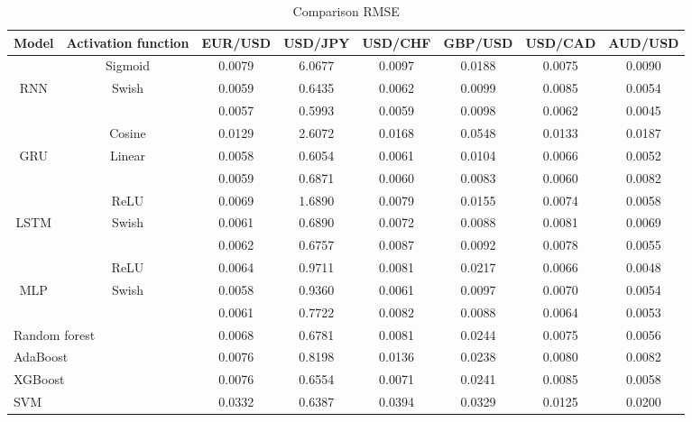 \documentclass{ieeeaccess}
\begin{document}
\begin{table}[t]
  \caption{Comparison RMSE}
  \small
  \centering
  \begin{tabular*}{0.9\textwidth}{c @{\extracolsep{\fill}} ccccccc}
    \hline
    \textbf{Model} & \textbf{Activation function} & \textbf{EUR/USD} & \textbf{USD/JPY} & \textbf{USD/CHF} & \textbf{GBP/USD} & \textbf{USD/CAD} & \textbf{AUD/USD} \\
    \hline

           & Sigmoid & 0.0079 & 6.0677 & 0.0097 & 0.0188 & 0.0075 & 0.0090 \\
    RNN    & Swish & 0.0059 & 0.6435 & 0.0062 & 0.0099 & 0.0085 & 0.0054 \\
           & \cite{Munkhdalai2019} & 0.0057 & 0.5993 & 0.0059 & 0.0098 & 0.0062 & 0.0045 \\

    \hline

           & Cosine & 0.0129 & 2.6072 & 0.0168 & 0.0548 & 0.0133 & 0.0187 \\
    GRU    & Linear & 0.0058 & 0.6054 & 0.0061 & 0.0104 & 0.0066 & 0.0052 \\
           & \cite{Munkhdalai2019} & 0.0059 & 0.6871 & 0.0060 & 0.0083 & 0.0060 & 0.0082 \\

    \hline

           & ReLU & 0.0069 & 1.6890 & 0.0079 & 0.0155 & 0.0074 & 0.0058 \\
    LSTM   & Swish & 0.0061 & 0.6890 & 0.0072 & 0.0088 & 0.0081 & 0.0069 \\
           & \cite{Munkhdalai2019} & 0.0062 & 0.6757 & 0.0087 & 0.0092 & 0.0078 & 0.0055 \\
    
    \hline

           & ReLU & 0.0064 & 0.9711 & 0.0081 & 0.0217 & 0.0066 & 0.0048 \\
    MLP    & Swish & 0.0058 & 0.9360 & 0.0061 & 0.0097 & 0.0070 & 0.0054 \\
           & \cite{Munkhdalai2019} & 0.0061 & 0.7722 & 0.0082 & 0.0088 & 0.0064 & 0.0053 \\

    \hline

    \multicolumn{2}{l}{Random forest} & 0.0068 & 0.6781 & 0.0081 & 0.0244 & 0.0075 & 0.0056 \\
    \multicolumn{2}{l}{AdaBoost} & 0.0076 & 0.8198 & 0.0136 & 0.0238 & 0.0080 & 0.0082 \\
    \multicolumn{2}{l}{XGBoost} & 0.0076 & 0.6554 & 0.0071 & 0.0241 & 0.0085 & 0.0058 \\
    \multicolumn{2}{l}{SVM} & 0.0332 & 0.6387 & 0.0394 & 0.0329 & 0.0125 & 0.0200 \\


\end{tabular*}
\end{table}
\end{document}
